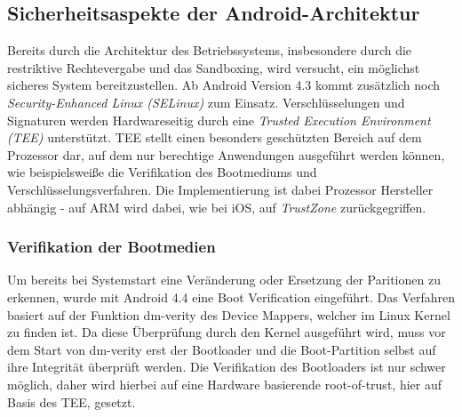 \subsection{Sicherheitsaspekte der Android-Architektur}

	Bereits durch die Architektur des Betriebssystems, insbesondere durch die restriktive Rechtevergabe und das Sandboxing, wird versucht, ein möglichst sicheres System bereitzustellen. Ab Android Version 4.3 kommt zusätzlich noch \textit{Security-Enhanced Linux (SELinux)} zum Einsatz. Verschlüsselungen und Signaturen werden Hardwareseitig durch eine \textit{Trusted Execution Environment (TEE)} unterstützt. TEE stellt einen besonders geschützten Bereich auf dem Prozessor dar, auf dem nur berechtige Anwendungen ausgeführt werden können, wie beispielsweiße die Verifikation des Bootmediums und Verschlüsselungsverfahren. Die Implementierung ist dabei Prozessor Hersteller abhängig - auf ARM wird dabei, wie bei iOS, auf \textit{TrustZone}\cite{TEE_ARM} zurückgegriffen.
	
	\subsubsection{Verifikation der Bootmedien}
	\label{sec:VerifikationDerBootmedien} Um bereits bei Systemstart eine Veränderung oder Ersetzung der Paritionen zu erkennen, wurde mit Android 4.4 eine Boot Verification eingeführt. Das Verfahren basiert auf der Funktion dm-verity des Device Mappers, welcher im Linux Kernel zu finden ist. Da diese Überprüfung durch den Kernel ausgeführt wird, muss vor dem Start von dm-verity erst der Bootloader und die Boot-Partition selbst auf ihre Integrität überprüft werden.
	Die Verifikation des Bootloaders ist nur schwer möglich, daher wird hierbei auf eine Hardware basierende root-of-trust, hier auf Basis des TEE, gesetzt. 
	
